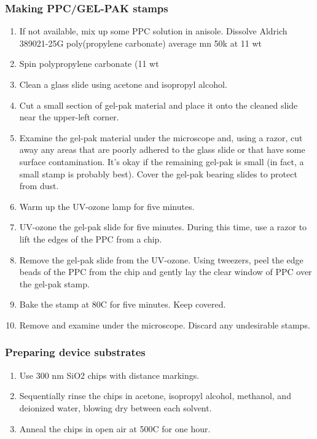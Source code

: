 \begin{appendices}
\subsubsection{Making PPC/GEL-PAK stamps}
\begin{enumerate}
	\item If not available, mix up some PPC solution in anisole. Dissolve Aldrich 389021-25G poly(propylene carbonate) average mn 50k at 11 wt%
	\item Spin polypropylene carbonate (11 wt%
	\item Clean a glass slide using acetone and isopropyl alcohol.
	\item Cut a small section of gel-pak material and place it onto the cleaned slide near the upper-left corner.
	\item Examine the gel-pak material under the microscope and, using a razor, cut away any areas that are poorly adhered to the glass slide or that have some surface contamination. It’s okay if the remaining gel-pak is small (in fact, a small stamp is probably best). Cover the gel-pak bearing slides to protect from dust.
	\item Warm up the UV-ozone lamp for five minutes.
	\item UV-ozone the gel-pak slide for five minutes. During this time, use a razor to lift the edges of the PPC from a chip.
	\item Remove the gel-pak slide from the UV-ozone. Using tweezers, peel the edge beads of the PPC from the chip and gently lay the clear window of PPC over the gel-pak stamp.
	\item Bake the stamp at 80C for five minutes. Keep covered.
	\item Remove and examine under the microscope. Discard any undesirable stamps.
\end{enumerate}

\subsubsection{Preparing device substrates}
\begin{enumerate}
	\item Use 300 nm SiO2 chips with distance markings.
	\item Sequentially rinse the chips in acetone, isopropyl alcohol, methanol, and deionized water, blowing dry between each solvent.
	\item Anneal the chips in open air at 500C for one hour.
\end{enumerate}


\end{appendices}
